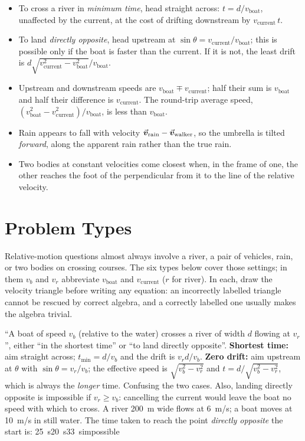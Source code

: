 \begin{itemize}
\item To cross a river in \emph{minimum time}, head straight across: $t=d/v_{\text{boat}}$, unaffected by
      the current, at the cost of drifting downstream by $v_{\text{current}}\,t$.
\item To land \emph{directly opposite}, head upstream at $\sin\theta=v_{\text{current}}/v_{\text{boat}}$;
      this is possible only if the boat is faster than the current. If it is not, the least drift is
      $d\sqrt{v_{\text{current}}^2-v_{\text{boat}}^2}/v_{\text{boat}}$.
\item Upstream and downstream speeds are $v_{\text{boat}}\mp v_{\text{current}}$; half their sum is
      $v_{\text{boat}}$ and half their difference is $v_{\text{current}}$. The round-trip average speed,
      $(v_{\text{boat}}^2-v_{\text{current}}^2)/v_{\text{boat}}$, is less than $v_{\text{boat}}$.
\item Rain appears to fall with velocity $\vec{\bm{v}}_{\text{rain}}-\vec{\bm{v}}_{\text{walker}}$, so the umbrella is
      tilted \emph{forward}, along the apparent rain rather than the true rain.
\item Two bodies at constant velocities come closest when, in the frame of one, the other reaches the
      foot of the perpendicular from it to the line of the relative velocity.
\end{itemize}

\section{Problem Types}\label{sec:types5}
Relative-motion questions almost always involve a river, a pair of vehicles, rain, or two bodies on
crossing courses. The six types below cover those settings; in them $v_b$ and $v_r$ abbreviate
$v_{\text{boat}}$ and $v_{\text{current}}$ ($r$ for river). In each, draw the velocity triangle before writing any equation: an
incorrectly labelled triangle cannot be rescued by correct algebra, and a correctly labelled one usually
makes the algebra trivial.

{``A boat of speed $v_b$ (relative to the water) crosses a river of width $d$ flowing at $v_r$'', either
``in the shortest time'' or ``to land directly opposite''.}
{\textbf{Shortest time:} aim straight across; $t_{\min}=d/v_b$ and the drift is $v_rd/v_b$.
\textbf{Zero drift:} aim upstream at $\theta$ with $\sin\theta=v_r/v_b$; the effective speed is
$\sqrt{v_b^2-v_r^2}$ and $t=d/\sqrt{v_b^2-v_r^2}$, which is always the \emph{longer} time.}
{Confusing the two cases. Also, landing directly opposite is impossible if $v_r\ge v_b$: cancelling the
current would leave the boat no speed with which to cross.}
{A river \SI{200}{m} wide flows at \SI{6}{m/s}; a boat moves at \SI{10}{m/s} in still water. The time
taken to reach the point \emph{directly opposite} the start is:}
{\SI{25}{s}}{\SI{20}{s}}{\SI{33}{s}}{impossible}

